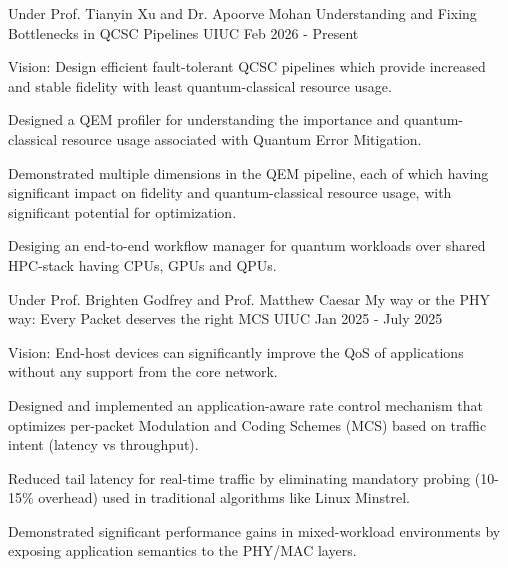 


\begin{cventries}

  \cventry
    {Under Prof. Tianyin Xu and Dr. Apoorve Mohan} %
    {Understanding and Fixing Bottlenecks in QCSC Pipelines} %
    {UIUC} %
    {Feb 2026 - Present} %
    {
      \begin{cvitems} %
        \item Vision: Design efficient fault-tolerant QCSC pipelines which provide increased and stable fidelity with least quantum-classical resource usage.
        \item Designed a QEM profiler for understanding the importance and quantum-classical resource usage associated with Quantum Error Mitigation.
        \item Demonstrated multiple dimensions in the QEM pipeline, each of which having significant impact on fidelity and quantum-classical resource usage, with significant potential for optimization.
        \item Desiging an end-to-end workflow manager for quantum workloads over shared HPC-stack having CPUs, GPUs and QPUs.
      \end{cvitems}
    }


  \cventry
    {Under Prof. Brighten Godfrey and Prof. Matthew Caesar} %
    {My way or the PHY way: Every Packet deserves the right MCS} %
    {UIUC} %
    {Jan 2025 - July 2025} %
    {
      \begin{cvitems} %
        \item Vision: End-host devices can significantly improve the QoS of applications without any support from the core network.
        \item Designed and implemented an application-aware rate control mechanism that optimizes per-packet Modulation and Coding Schemes (MCS) based on traffic intent (latency vs throughput).
        \item Reduced tail latency for real-time traffic by eliminating mandatory probing (10-15\% overhead) used in traditional algorithms like Linux Minstrel.
        \item Demonstrated significant performance gains in mixed-workload environments by exposing application semantics to the PHY/MAC layers.
      \end{cvitems}
    }


\end{cventries}

